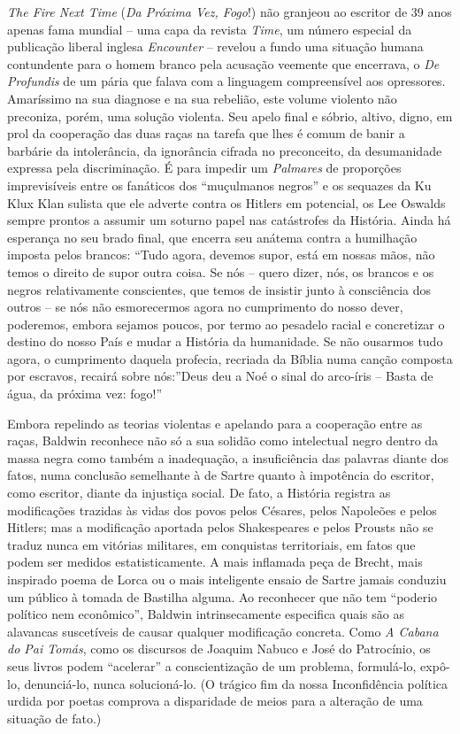 \documentclass[
  letterpaper,
  DIV=11,
  numbers=noendperiod]{scrreprt}
\begin{document}
\emph{The Fire Next Time} (\emph{Da Próxima Vez, Fogo}!) não granjeou ao
escritor de 39 anos apenas fama mundial -- uma capa da revista
\emph{Time}, um número especial da publicação liberal inglesa
\emph{Encounter} -- revelou a fundo uma situação humana contundente para
o homem branco pela acusação veemente que encerrava, o \emph{De
Profundis} de um pária que falava com a linguagem compreensível aos
opressores. Amaríssimo na sua diagnose e na sua rebelião, este volume
violento não preconiza, porém, uma solução violenta. Seu apelo final e
sóbrio, altivo, digno, em prol da cooperação das duas raças na tarefa
que lhes é comum de banir a barbárie da intolerância, da ignorância
cifrada no preconceito, da desumanidade expressa pela discriminação. É
para impedir um \emph{Palmares} de proporções imprevisíveis entre os
fanáticos dos ``muçulmanos negros'' e os sequazes da Ku Klux Klan
sulista que ele adverte contra os Hitlers em potencial, os Lee Oswalds
sempre prontos a assumir um soturno papel nas catástrofes da História.
Ainda há esperança no seu brado final, que encerra seu anátema contra a
humilhação imposta pelos brancos: ``Tudo agora, devemos supor, está em
nossas mãos, não temos o direito de supor outra coisa. Se nós -- quero
dizer, nós, os brancos e os negros relativamente conscientes, que temos
de insistir junto à consciência dos outros -- se nós não esmorecermos
agora no cumprimento do nosso dever, poderemos, embora sejamos poucos,
por termo ao pesadelo racial e concretizar o destino do nosso País e
mudar a História da humanidade. Se não ousarmos tudo agora, o
cumprimento daquela profecia, recriada da Bíblia numa canção composta
por escravos, recairá sobre nós:''Deus deu a Noé o sinal do arco-íris --
Basta de água, da próxima vez: fogo!''

Embora repelindo as teorias violentas e apelando para a cooperação entre
as raças, Baldwin reconhece não só a sua solidão como intelectual negro
dentro da massa negra como também a inadequação, a insuficiência das
palavras diante dos fatos, numa conclusão semelhante à de Sartre quanto
à impotência do escritor, como escritor, diante da injustiça social. De
fato, a História registra as modificações trazidas às vidas dos povos
pelos Césares, pelos Napoleões e pelos Hitlers; mas a modificação
aportada pelos Shakespeares e pelos Prousts não se traduz nunca em
vitórias militares, em conquistas territoriais, em fatos que podem ser
medidos estatisticamente. A mais inflamada peça de Brecht, mais
inspirado poema de Lorca ou o mais inteligente ensaio de Sartre jamais
conduziu um público à tomada de Bastilha alguma. Ao reconhecer que não
tem ``poderio político nem econômico'', Baldwin intrinsecamente
especifica quais são as alavancas suscetíveis de causar qualquer
modificação concreta. Como \emph{A Cabana do Pai Tomás}, como os
discursos de Joaquim Nabuco e José do Patrocínio, os seus livros podem
``acelerar'' a conscientização de um problema, formulá-lo, expô-lo,
denunciá-lo, nunca solucioná-lo. (O trágico fim da nossa Inconfidência
política urdida por poetas comprova a disparidade de meios para a
alteração de uma situação de fato.)
\end{document}
